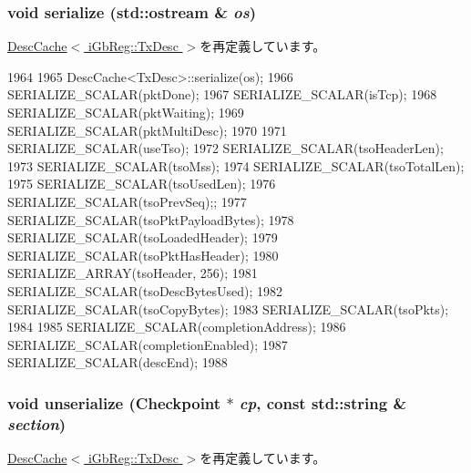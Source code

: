 \hypertarget{classIGbE_1_1TxDescCache_a53e036786d17361be4c7320d39c99b84}{
\subsubsection[{serialize}]{\setlength{\rightskip}{0pt plus 5cm}void serialize (std::ostream \& {\em os})}}
\label{classIGbE_1_1TxDescCache_a53e036786d17361be4c7320d39c99b84}


\hyperlink{classIGbE_1_1DescCache_a53e036786d17361be4c7320d39c99b84}{DescCache$<$ iGbReg::TxDesc $>$}を再定義しています。


\begin{DoxyCode}
1964 {
1965     DescCache<TxDesc>::serialize(os);
1966     SERIALIZE_SCALAR(pktDone);
1967     SERIALIZE_SCALAR(isTcp);
1968     SERIALIZE_SCALAR(pktWaiting);
1969     SERIALIZE_SCALAR(pktMultiDesc);
1970 
1971     SERIALIZE_SCALAR(useTso);
1972     SERIALIZE_SCALAR(tsoHeaderLen);
1973     SERIALIZE_SCALAR(tsoMss);
1974     SERIALIZE_SCALAR(tsoTotalLen);
1975     SERIALIZE_SCALAR(tsoUsedLen);
1976     SERIALIZE_SCALAR(tsoPrevSeq);;
1977     SERIALIZE_SCALAR(tsoPktPayloadBytes);
1978     SERIALIZE_SCALAR(tsoLoadedHeader);
1979     SERIALIZE_SCALAR(tsoPktHasHeader);
1980     SERIALIZE_ARRAY(tsoHeader, 256);
1981     SERIALIZE_SCALAR(tsoDescBytesUsed);
1982     SERIALIZE_SCALAR(tsoCopyBytes);
1983     SERIALIZE_SCALAR(tsoPkts);
1984 
1985     SERIALIZE_SCALAR(completionAddress);
1986     SERIALIZE_SCALAR(completionEnabled);
1987     SERIALIZE_SCALAR(descEnd);
1988 }
\end{DoxyCode}
\hypertarget{classIGbE_1_1TxDescCache_af22e5d6d660b97db37003ac61ac4ee49}{
\subsubsection[{unserialize}]{\setlength{\rightskip}{0pt plus 5cm}void unserialize ({\bf Checkpoint} $\ast$ {\em cp}, \/  const std::string \& {\em section})}}
\label{classIGbE_1_1TxDescCache_af22e5d6d660b97db37003ac61ac4ee49}


\hyperlink{classIGbE_1_1DescCache_af22e5d6d660b97db37003ac61ac4ee49}{DescCache$<$ iGbReg::TxDesc $>$}を再定義しています。


